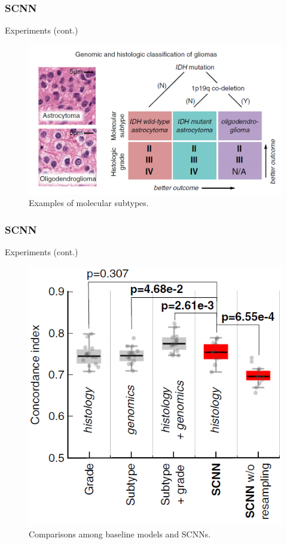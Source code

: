 \documentclass{beamer}
\begin{document}
	\begin{frame}
		\frametitle{SCNN}
		Experiments (cont.)
		
		\begin{figure}[H]
			\centering
			\includegraphics[scale=0.35]{figures/molecular-subtype.png}
			\caption{Examples of molecular subtypes.}
			\label{fig:ms}
		\end{figure}
	\end{frame}
	
	\begin{frame}
		\frametitle{SCNN}
		Experiments (cont.)
		
		\begin{figure}[H]
			\centering
			\includegraphics[scale=0.35]{figures/c-index.png}
			\caption{Comparisons among baseline models and SCNNs.}
			\label{fig:c-index}
		\end{figure}
	\end{frame}
	
\end{document}
